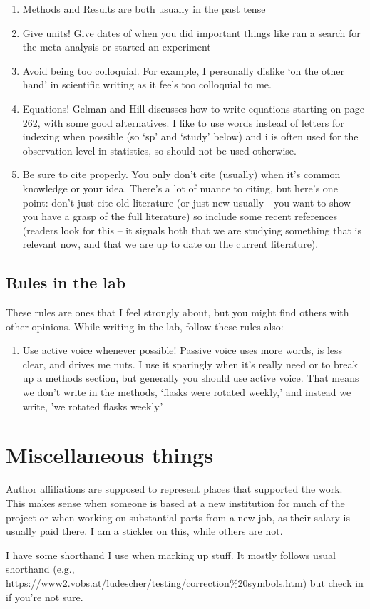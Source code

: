 \documentclass[11pt,letter]{article}
\begin{document}
\begin{enumerate}
\item Methods and Results are both usually in the past tense
\item Give units! Give dates of when you did important things like ran a search for the meta-analysis or started an experiment
\item Avoid being too colloquial. For example, I personally dislike `on the other hand' in scientific writing as it feels too colloquial to me. 
\item Equations! Gelman and Hill discusses how to write equations starting on page 262, with some good alternatives. I like to use words instead of letters for indexing when possible (so `sp' and `study' below) and i is often used for the observation-level in statistics, so should not be used otherwise. 
\item Be sure to cite properly. You only don't cite (usually) when it's common knowledge or your idea. There's a lot of nuance to citing, but here's one point: don't just cite old literature (or just new usually---you want to show you have a grasp of the full literature) so include some recent references (readers look for this -- it signals both that we are studying something that is relevant now, and that we are up to date on the current literature).
\end{enumerate}

\subsection{Rules in the lab}

These rules are ones that I feel strongly about, but you might find others with other opinions. While writing in the lab, follow these rules also:
\begin{enumerate}
\item Use active voice whenever possible! Passive voice uses more words, is less clear, and drives me nuts. I use it sparingly when it's really need or to break up a methods section, but generally you should use active voice. That means we don't write in the methods, `flasks were rotated weekly,' and instead we write, 'we rotated flasks weekly.'
\end{enumerate}

\section{Miscellaneous things}

Author affiliations are supposed to represent places that supported the work. This makes sense when someone is based at a new institution for much of the project or when working on substantial parts from a new job, as their salary is usually paid there. I am a stickler on this, while others are not.

I have some shorthand I use when marking up stuff. It mostly follows usual shorthand (e.g., \url{https://www2.vobs.at/ludescher/testing/correction%20symbols.htm}) but check in if you're not sure. 
\end{document}
